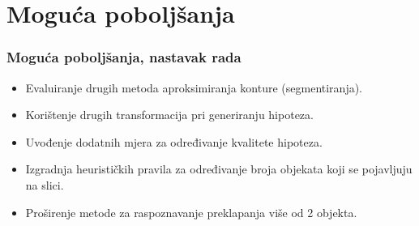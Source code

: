 \documentclass{beamer}
\begin{document}
\section{Moguća poboljšanja}
\begin{frame}
\frametitle{Moguća poboljšanja, nastavak rada}
\begin{itemize}
  \item Evaluiranje drugih metoda aproksimiranja konture (segmentiranja).
  \item Korištenje drugih transformacija pri generiranju hipoteza.
  \item Uvođenje dodatnih mjera za određivanje kvalitete hipoteza.
  \item Izgradnja heurističkih pravila za određivanje broja objekata koji se pojavljuju na slici.
  \item Proširenje metode za raspoznavanje preklapanja više od 2 objekta.
\end{itemize}
\end{frame}
\end{document}
